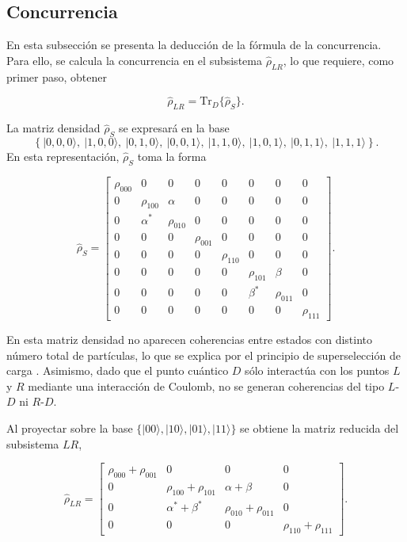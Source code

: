 \begin{appendixs}
\subsection{Concurrencia}
En esta subsección se presenta la deducción de la fórmula de la concurrencia. Para ello, se calcula la concurrencia en el subsistema $\hat{\rho}_{LR}$, lo que requiere, como primer paso, obtener  

\begin{equation*}
    \hat{\rho}_{LR} = \text{Tr}_{D}\{ \hat{\rho}_{S} \}.
\end{equation*}

La matriz densidad $\hat{\rho}_{S}$ se expresará en la base  
\[
\left\{ |0,0,0\rangle,\ |1,0,0\rangle,\ |0,1,0\rangle,\ |0,0,1\rangle,\ |1,1,0\rangle,\ |1,0,1\rangle,\ |0,1,1\rangle,\ |1,1,1\rangle \right\}.
\]
En esta representación, $\hat{\rho}_{S}$ toma la forma

\begin{equation}
    \hat{\rho}_{S} = 
    \begin{bmatrix}
        \rho_{000} & 0 & 0 & 0 & 0 & 0 & 0 & 0 \\
        0 & \rho_{100} & \alpha & 0 & 0 & 0 & 0 & 0 \\
        0 & \alpha^{*} & \rho_{010} & 0 & 0 & 0 & 0 & 0 \\
        0 & 0 & 0 & \rho_{001} & 0 & 0 & 0 & 0 \\
        0 & 0 & 0 & 0 & \rho_{110} & 0 & 0 & 0 \\
        0 & 0 & 0 & 0 & 0 & \rho_{101} & \beta & 0 \\
        0 & 0 & 0 & 0 & 0 & \beta^{*} & \rho_{011} & 0 \\
        0 & 0 & 0 & 0 & 0 & 0 & 0 & \rho_{111} 
        \end{bmatrix}.
        \label{appendix5rhoconcu}
\end{equation}

En esta matriz densidad no aparecen coherencias entre estados con distinto número total de partículas, lo que se explica por el principio de superselección de carga \cite{bartlett2007reference,wick1997intrinsic}. Asimismo, dado que el punto cuántico $D$ sólo interactúa con los puntos $L$ y $R$ mediante una interacción de Coulomb, no se generan coherencias del tipo $L$-$D$ ni $R$-$D$. 

Al proyectar sobre la base $\{|00\rangle, |10\rangle, |01\rangle, |11\rangle\}$ se obtiene la matriz reducida del subsistema $LR$,

\begin{equation*}
    \hat{\rho}_{LR} = 
    \begin{bmatrix}
        \rho_{000}+\rho_{001} & 0 & 0 & 0  \\
        0 & \rho_{100} + \rho_{101} & \alpha + \beta & 0  \\
        0 & \alpha^{*} + \beta^{*} & \rho_{010} + \rho_{011} & 0  \\
        0 & 0 & 0 & \rho_{110} + \rho_{111} 
        \end{bmatrix}.
\end{equation*}


\end{appendixs}
